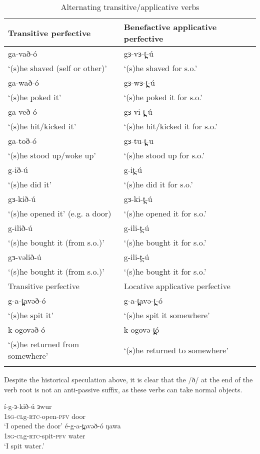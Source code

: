 \begin{table}
\begin{tabular}[t]{ll}
\lsptoprule
{Transitive perfective}	& 	{Benefactive applicative perfective} \\
\midrule
ga-vað-ó &  gɜ-vɜ-t̪-ú \\
`(s)he shaved (self or other)' & `(s)he shaved for s.o.' \\  
ga-wað-ó &  gɜ-wɜ-t̪-ú \\
`(s)he poked it' & `(s)he poked it for s.o.' \\  
ga-veð-ó &  gɜ-vi-t̪-ú \\
`(s)he hit/kicked it' & `(s)he hit/kicked it for s.o.' \\  
ga-toð-ó & gɜ-tu-t̪-u \\  
`(s)he stood up/woke up' &  `(s)he stood up for s.o.' \\ 
g-ið-ú &  g-it̪-ú  \\
`(s)he did it' & `(s)he did it for s.o.'\\
gɜ-kið-ú &  gɜ-ki-t̪-ú \\
`(s)he opened it' (e.g. a door) &`(s)he opened it for s.o.' \\  
g-ilið-ú	& g-ili-t̪-ú	\\
`(s)he bought it (from s.o.)'&	`(s)he bought it for s.o.' \\
gɜ-vəlið-ú	& g-ili-t̪-ú	\\
`(s)he bought it (from s.o.)'&	`(s)he bought it for s.o.' \\
\lsptoprule 
{Transitive perfective}			& 	{Locative applicative perfective} \\
\midrule 
g-a-t̪avəð-ó	&  g-a-t̪avə-t̪-ó \\
‘(s)he spit it’ 	&  ‘(s)he spit it somewhere’  \\
k-ogovəð-ó & k-ogovə-t̪ó  \\
‘(s)he returned from somewhere’ 	&  ‘(s)he returned to somewhere’  \\
\lspbottomrule
\end{tabular}
\caption{Alternating transitive/applicative verbs}	\label{tab:ch11:taalt} 
\end{table}

Despite the historical speculation above, it is clear that the /ð/ at the end of the verb root is not an anti-passive suffix, as these verbs can take normal objects. 

\ea \gll í-g-ɜ-kið-ú ɜwur\\
		 \textsc{1sg-cl}g-\textsc{rtc}-open-\textsc{pfv} door\\
 	\glt `I opened the door' 
\ex \gll  é-g-a-t̪avəð-ó ŋawa \\
	 	  \textsc{1sg-cl}g-\textsc{rtc}-spit-\textsc{pfv} water\\
	\glt  `I spit water.'
\z

